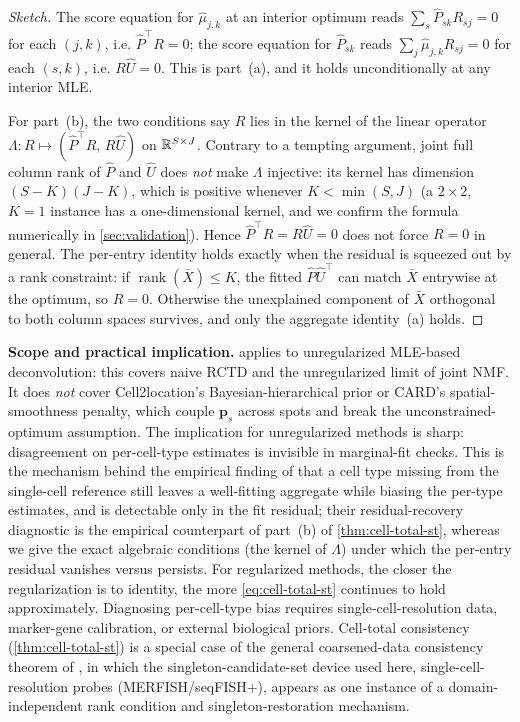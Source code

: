 \begin{proof}[Sketch]
The score equation for $\hat\mu_{j,k}$ at an interior optimum reads
$\sum_s \hat P_{sk} R_{sj} = 0$ for each $(j,k)$, i.e. $\hat P^\top R
= 0$; the score equation for $\hat P_{sk}$ reads $\sum_j
\hat\mu_{j,k} R_{sj} = 0$ for each $(s,k)$, i.e. $R\hat U = 0$. This
is part~(a), and it holds unconditionally at any interior MLE.

For part~(b), the two conditions say $R$ lies in the kernel of the
linear operator $\Lambda: R \mapsto (\hat P^\top R,\, R\hat U)$ on
$\mathbb{R}^{S\times J}$. Contrary to a tempting argument, joint full column
rank of $\hat P$ and $\hat U$ does \emph{not} make $\Lambda$
injective: its kernel has dimension $(S-K)(J-K)$, which is positive
whenever $K < \min(S,J)$ (a $2\times 2$, $K=1$ instance has a
one-dimensional kernel, and we confirm the formula numerically in
\cref{sec:validation}). Hence $\hat P^\top R = R\hat U = 0$ does not
force $R = 0$ in general. The per-entry identity holds exactly when
the residual is squeezed out by a rank constraint: if
$\operatorname{rank}(\bar X)\le K$, the fitted $\hat P\hat U^\top$
can match $\bar X$ entrywise at the optimum, so $R = 0$. Otherwise
the unexplained component of $\bar X$ orthogonal to both column
spaces survives, and only the aggregate identity~(a) holds.
\end{proof}

\textbf{Scope and practical implication.} 
applies to unregularized MLE-based deconvolution: this covers naive
RCTD and the unregularized limit of joint NMF. It does \emph{not}
cover Cell2location's Bayesian-hierarchical prior or CARD's
spatial-smoothness penalty, which couple $\bm{p}_s$ across spots and
break the unconstrained-optimum assumption. The implication for
unregularized methods is sharp: disagreement on per-cell-type
estimates is invisible in marginal-fit checks. This is the mechanism
behind the empirical finding of \citet{ivich2025missing} that a cell
type missing from the single-cell reference still leaves a well-fitting
aggregate while biasing the per-type estimates, and is detectable only
in the fit residual; their residual-recovery diagnostic is the
empirical counterpart of part~(b) of \cref{thm:cell-total-st}, whereas
we give the exact algebraic conditions (the kernel of $\Lambda$) under
which the per-entry residual vanishes versus persists. For regularized
methods, the closer the regularization is to identity, the more
\eqref{eq:cell-total-st} continues to hold approximately. Diagnosing
per-cell-type bias requires single-cell-resolution data, marker-gene
calibration, or external biological priors. Cell-total consistency
(\cref{thm:cell-total-st}) is a special case of the general
coarsened-data consistency theorem of \citet{towell2026synthesis}, in
which the singleton-candidate-set device used here, single-cell-resolution
probes (MERFISH/seqFISH+), appears as one instance of a
domain-independent rank condition and singleton-restoration mechanism.
